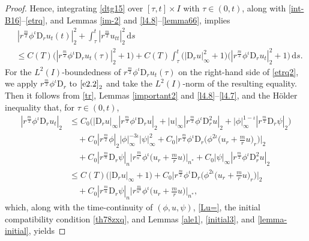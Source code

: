 \documentclass[11pt,reqno]{amsart}
\numberwithin{rk}{section}
\numberwithin{prop}{section}
\numberwithin{mydef}{section}
\numberwithin{lem}{section}
\numberwithin{equation}{section}
\numberwithin{thm}{section}
\begin{document}
\begin{proof}
Hence, integrating \eqref{dtg15} over $[\tau,t]\times I$ with $\tau\in (0,t)$, along with \eqref{int-B16}--\eqref{etrq}, and Lemmas \ref{im-2} and \ref{l4.8}--\ref{lemma66}, implies 
\begin{equation}\label{etrq2}
\begin{aligned}
&\,|r^{\frac{m}{2}}\phi^\iota\mathrm{D}_r u_t(t)|^2_2+\int_{\tau}^{t}  |r^{\frac{m}{2}}u_{tt}|^2_2 \,\mathrm{d}s\\
&\leq C(T)\big(|r^{\frac{m}{2}}\phi^\iota\mathrm{D}_r u_t(\tau)|^2_2+1\big)+C(T) \int_\tau^t \big(|\mathrm{D}_ru|_\infty^2 +1\big)\big(|r^\frac{m}{2}\phi^{\iota}\mathrm{D}_r u_t|_2^2+1\big)\,\mathrm{d}s.
\end{aligned}
\end{equation}
For the $L^2(I)$-boundedness of $r^{\frac{m}{2}}\phi^\iota\mathrm{D}_r u_t(\tau)$ 
on the right-hand side of \eqref{etrq2}, we apply $r^\frac{m}{2}\phi^\iota \mathrm{D}_r$ to $\eqref{e2.2}_2$  and take the $L^2(I)$-norm of the resulting equality. Then it follows from \eqref{tr}, Lemmas \ref{important2} and \ref{l4.8}--\ref{l4.7}, and the H\"older inequality that, for $\tau \in (0,t)$,
\begin{equation*}
\begin{aligned}
|r^{\frac{m}{2}}\phi^\iota\mathrm{D}_r u_t |_2&\leq C_0\big(|\mathrm{D}_ru |_\infty|r^{\frac{m}{2}}\phi^\iota \mathrm{D}_r u |_2+|u |_\infty|r^{\frac{m}{2}}\phi^\iota \mathrm{D}_r^2 u |_2 +|\phi|_\infty^{1-\iota}|r^{\frac{m}{2}} \mathrm{D}_r\psi|_2\big)\\
&\quad + C_0 |r^\frac{m}{2}\phi|_2|\phi|_\infty^{-3\iota}| \psi|_\infty^2+ C_0\Big|r^{\frac{m}{2}}\phi^\iota \mathrm{D}_r\Big(\phi^{2\iota}\big(u_r+\frac{m}{r}u\big)_r\Big) \Big|_2\\
&\quad +C_0 |r^\frac{m}{n}\mathrm{D}_r\psi|_n \Big|r^\frac{m}{n^*}\phi^\iota \big(u_r+\frac{m}{r}u\big) \Big|_{n^*}+C_0|\psi |_\infty|r^{\frac{m}{2}}\phi^{\iota} \mathrm{D}_r^2 u|_2\\
&\leq C(T)\big(|\mathrm{D}_ru |_\infty  +1\big)  + C_0\Big|r^{\frac{m}{2}}\phi^\iota \mathrm{D}_r\Big(\phi^{2\iota}\big(u_r+\frac{m}{r}u\big)_r\Big) \Big|_2 \\
&\quad +C_0 |r^\frac{m}{n}\mathrm{D}_r\psi|_n \Big|r^\frac{m}{n^*}\phi^\iota \big(u_r+\frac{m}{r}u\big)\Big|_{n^*},
\end{aligned}
\end{equation*}
which, along with the time-continuity of $(\phi,u,\psi)$, \eqref{Lu=}, the initial compatibility condition \eqref{th78zxq}, and 
Lemmas \ref{ale1}, \ref{initial3}, and \ref{lemma-initial}, yields

\end{proof}
\end{document}

